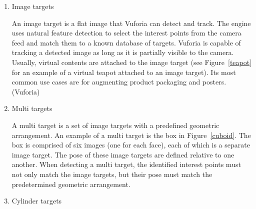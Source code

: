 \begin{enumerate}
\item Image targets

An image target is a flat image that Vuforia can detect and track. The engine uses natural feature detection to select the interest points from the camera feed and match them to a known database of targets. Vuforia is capable of tracking a detected image as long as it is partially visible to the camera. Usually, virtual contents are attached to the image target (see Figure~\ref{teapot} for an example of a virtual teapot attached to an image target). Its most common use cases are for augmenting product packaging and posters. (Vuforia)

\begin{figure}[!ht]
\end{figure}

\begin{figure}[!ht]
\end{figure}

\item Multi targets

A multi target is a set of image targets with a predefined geometric arrangement. An example of a multi target is the box in Figure~\ref{cuboid}. The box is comprised of six images (one for each face), each of which is a separate image target. The pose of these image targets are defined relative to one another. When detecting a multi target, the identified interest points must not only match the image targets, but their pose must match the predetermined geometric arrangement.

\item Cylinder targets


\end{enumerate}
